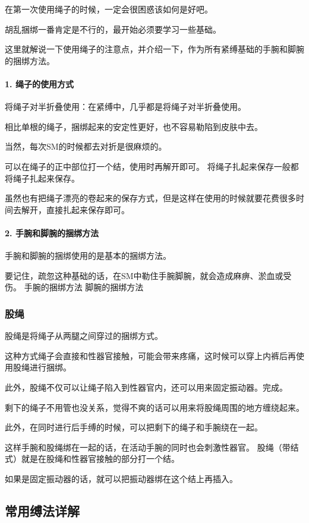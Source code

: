 \documentclass[12pt,UTF8]{ctexbook}
\begin{document}
在第一次使用绳子的时候，一定会很困惑该如何是好吧。

胡乱捆绑一番肯定是不行的，最开始必须要学习一些基础。

这里就解说一下使用绳子的注意点，并介绍一下，作为所有紧缚基础的手腕和脚腕的捆绑方法。

\paragraph{1. 绳子的使用方式}

将绳子对半折叠使用：在紧缚中，几乎都是将绳子对半折叠使用。

相比单根的绳子，捆绑起来的安定性更好，也不容易勒陷到皮肤中去。

当然，每次SM的时候都去对折是很麻烦的。

可以在绳子的正中部位打一个结，使用时再解开即可。 将绳子扎起来保存一般都将绳子扎起来保存。

虽然也有把绳子漂亮的卷起来的保存方式，但是这样在使用的时候就要花费很多时间去解开，直接扎起来保存即可。

\paragraph{2. 手腕和脚腕的捆绑方法}

手腕和脚腕的捆绑使用的是基本的捆绑方法。

要记住，疏忽这种基础的话，在SM中勒住手腕脚腕，就会造成麻痹、淤血或受伤。 手腕的捆绑方法 脚腕的捆绑方法

\subsubsection{股绳}

股绳是将绳子从两腿之间穿过的捆绑方式。

这种方式绳子会直接和性器官接触，可能会带来疼痛，这时候可以穿上内裤后再使用股绳进行捆绑。

此外，股绳不仅可以让绳子陷入到性器官内，还可以用来固定振动器。完成。

剩下的绳子不用管也没关系，觉得不爽的话可以用来将股绳周围的地方缠绕起来。

此外，在同时进行后手缚的时候，可以把剩下的绳子和手腕绕在一起。

这样手腕和股绳绑在一起的话，在活动手腕的同时也会刺激性器官。 股绳（带结式）就是在股绳和性器官接触的部分打一个结。

如果是固定振动器的话，就可以把振动器绑在这个结上再插入。

\subsection{常用缚法详解}
\end{document}
